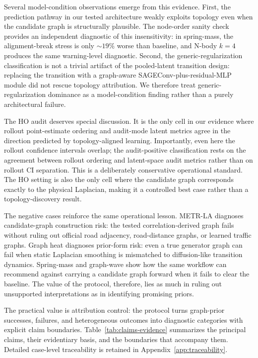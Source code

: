 \documentclass[preprint,12pt]{elsarticle}
\begin{document}
Several model-condition observations emerge from this evidence. 
First, the prediction pathway in our tested architecture weakly 
exploits topology even when the candidate graph is structurally 
plausible. The node-order sanity check provides an independent 
diagnostic of this insensitivity: in spring-mass, the alignment-break 
stress is only \(\sim 19\%\) worse than baseline, and N-body \(k=4\) 
produces the same warning-level diagnostic. Second, the 
generic-regularization classification is not a trivial artifact of 
the pooled-latent transition design: replacing the transition with a 
graph-aware SAGEConv-plus-residual-MLP module did not rescue topology 
attribution. We therefore treat generic-regularization dominance as 
a model-condition finding rather than a purely architectural failure.

The HO audit deserves special discussion. It is the only cell in 
our evidence where rollout point-estimate ordering and audit-mode 
latent metrics agree in the direction predicted by topology-aligned 
learning. Importantly, even here the rollout confidence intervals 
overlap; the audit-positive classification rests on the agreement 
between rollout ordering and latent-space audit metrics rather than 
on rollout CI separation. This is a deliberately conservative 
operational standard. The HO setting is also the only cell where 
the candidate graph corresponds exactly to the physical Laplacian, 
making it a controlled best case rather than a topology-discovery 
result.

The negative cases reinforce the same operational lesson. METR-LA 
diagnoses candidate-graph construction risk: the tested 
correlation-derived graph fails without ruling out official road 
adjacency, road-distance graphs, or learned traffic graphs. Graph 
heat diagnoses prior-form risk: even a true generator graph can fail 
when static Laplacian smoothing is mismatched to diffusion-like 
transition dynamics. Spring-mass and graph-wave show how the same 
workflow can recommend against carrying a candidate graph forward 
when it fails to clear the baseline. The value of the protocol, 
therefore, lies as much in ruling out unsupported interpretations as 
in identifying promising priors.

The practical value is attribution control: the protocol turns 
graph-prior successes, failures, and heterogeneous outcomes into 
diagnostic categories with explicit claim boundaries. 
Table~\ref{tab:claims-evidence} summarizes the principal claims, 
their evidentiary basis, and the boundaries that accompany them. 
Detailed case-level traceability is retained in 
Appendix~\ref{app:traceability}.
\end{document}
